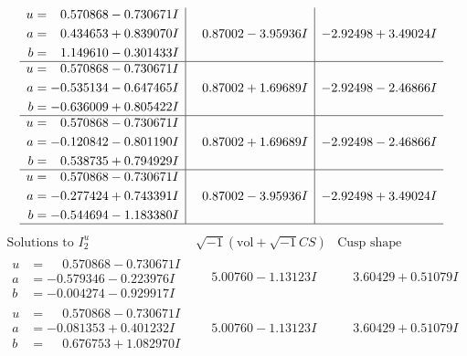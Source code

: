 \documentclass[1p]{elsarticle_modified}
\theoremstyle{definition}
\newcommand{\I}{\sqrt{-1}}
\begin{document}
$$\begin{array}{c|c|c}
\begin{aligned}
u &= \phantom{-}0.570868 - 0.730671 I \\
a &= \phantom{-}0.434653 + 0.839070 I \\
b &= \phantom{-}1.149610 - 0.301433 I\end{aligned}
 & \phantom{-}0.87002 - 3.95936 I & -2.92498 + 3.49024 I \\ \hline\begin{aligned}
u &= \phantom{-}0.570868 - 0.730671 I \\
a &= -0.535134 - 0.647465 I \\
b &= -0.636009 + 0.805422 I\end{aligned}
 & \phantom{-}0.87002 + 1.69689 I & -2.92498 - 2.46866 I \\ \hline\begin{aligned}
u &= \phantom{-}0.570868 - 0.730671 I \\
a &= -0.120842 - 0.801190 I \\
b &= \phantom{-}0.538735 + 0.794929 I\end{aligned}
 & \phantom{-}0.87002 + 1.69689 I & -2.92498 - 2.46866 I \\ \hline\begin{aligned}
u &= \phantom{-}0.570868 - 0.730671 I \\
a &= -0.277424 + 0.743391 I \\
b &= -0.544694 - 1.183380 I\end{aligned}
 & \phantom{-}0.87002 - 3.95936 I & -2.92498 + 3.49024 I\\
 \hline 
 \end{array}$$\newpage$$\begin{array}{c|c|c}  
\text{Solutions to }I^u_{2}& \I (\text{vol} + \sqrt{-1}CS) & \text{Cusp shape}\\
 \hline 
\begin{aligned}
u &= \phantom{-}0.570868 - 0.730671 I \\
a &= -0.579346 - 0.223976 I \\
b &= -0.004274 - 0.929917 I\end{aligned}
 & \phantom{-}5.00760 - 1.13123 I & \phantom{-}3.60429 + 0.51079 I \\ \hline\begin{aligned}
u &= \phantom{-}0.570868 - 0.730671 I \\
a &= -0.081353 + 0.401232 I \\
b &= \phantom{-}0.676753 + 1.082970 I\end{aligned}
 & \phantom{-}5.00760 - 1.13123 I & \phantom{-}3.60429 + 0.51079 I \\ \hline\begin{aligned}

\end{aligned}
\end{array}$$
\end{document}
